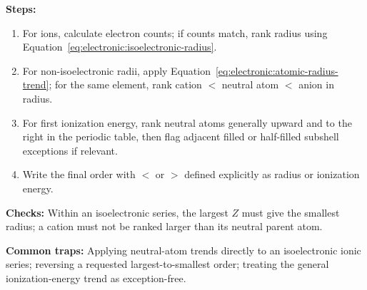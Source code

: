 \textbf{Steps:}
\begin{enumerate}
    \item For ions, calculate electron counts; if counts match, rank radius using Equation~\eqref{eq:electronic:isoelectronic-radius}.
    \item For non-isoelectronic radii, apply Equation~\eqref{eq:electronic:atomic-radius-trend}; for the same element, rank cation \(<\) neutral atom \(<\) anion in radius.
    \item For first ionization energy, rank neutral atoms generally upward and to the right in the periodic table, then flag adjacent filled or half-filled subshell exceptions if relevant.
    \item Write the final order with \(<\) or \(>\) defined explicitly as radius or ionization energy.
\end{enumerate}

\textbf{Checks:} Within an isoelectronic series, the largest \(Z\) must give the smallest radius; a cation must not be ranked larger than its neutral parent atom.

\textbf{Common traps:} Applying neutral-atom trends directly to an isoelectronic ionic series; reversing a requested largest-to-smallest order; treating the general ionization-energy trend as exception-free.
